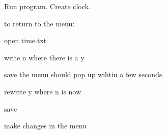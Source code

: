 Run program. Create clock.

to return to the menu\+:
\begin{DoxyEnumerate}
\item open time.\+txt
\item write \textquotesingle{}n\textquotesingle{} where there is a \textquotesingle{}y\textquotesingle{}
\item save the menu should pop up wihtin a few seconds
\item rewrite \textquotesingle{}y\textquotesingle{} where \textquotesingle{}n\textquotesingle{} is now
\item save
\item make changes in the menu 
\end{DoxyEnumerate}